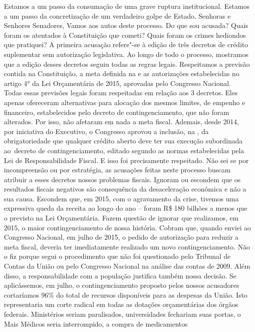 Estamos a um passo da consumação de uma grave ruptura institucional.
Estamos a um passo da concretização de um verdadeiro golpe de Estado.
Senhoras e Senhores Senadores, Vamos aos autos deste processo. Do que
sou acusada? Quais foram os atentados à Constituição que cometi? Quais
foram os crimes hediondos que pratiquei? A primeira acusação refere"-se à
edição de três decretos de crédito suplementar sem autorização
legislativa. Ao longo de todo o processo, mostramos que a edição desses
decretos seguiu todas as regras legais. Respeitamos a previsão contida
na Constituição, a meta definida na  e as autorizações estabelecidas
no artigo 4° da Lei Orçamentária de 2015, aprovadas pelo Congresso
Nacional. Todas essas previsões legais foram respeitadas em relação aos
3 decretos. Eles apenas ofereceram alternativas para alocação dos mesmos
limites, de empenho e financeiro, estabelecidos pelo decreto de
contingenciamento, que não foram alterados. Por isso, não afetaram em
nada a meta fiscal. Ademais, desde 2014, por iniciativa do Executivo, o
Congresso aprovou a inclusão, na , da obrigatoriedade que qualquer
crédito aberto deve ter sua execução subordinada ao~decreto de
contingenciamento, editado segundo as normas estabelecidas pela Lei de
Responsabilidade Fiscal. E isso foi precisamente respeitado. Não sei se
por incompreensão ou por estratégia, as acusações feitas neste processo
buscam atribuir a esses decretos nossos problemas fiscais. Ignoram ou
escondem que os resultados fiscais negativos são consequência da
desaceleração econômica e não a sua causa. Escondem que, em 2015, com o
agravamento da crise, tivemos uma expressiva queda da receita ao longo
do ano -- foram R\$ 180 bilhões a menos que o previsto na Lei
Orçamentária. Fazem questão de ignorar que realizamos, em 2015, o maior
contingenciamento de nossa história. Cobram que, quando enviei ao
Congresso Nacional, em julho de 2015, o pedido de autorização para
reduzir a meta fiscal, deveria ter imediatamente realizado um novo
contingenciamento. Não o fiz porque segui o procedimento que não foi
questionado pelo Tribunal de Contas da União ou pelo Congresso Nacional
na análise das contas de 2009. Além disso, a responsabilidade com a
população justifica também nossa decisão. Se aplicássemos, em julho, o
contingenciamento proposto pelos nossos acusadores cortaríamos 96\% do
total de recursos disponíveis para as despesas da União. Isto
representaria um corte radical em todas as dotações orçamentárias dos
órgãos federais. Ministérios seriam paralisados, universidades fechariam
suas portas, o Mais Médicos seria interrompido, a compra de medicamentos
